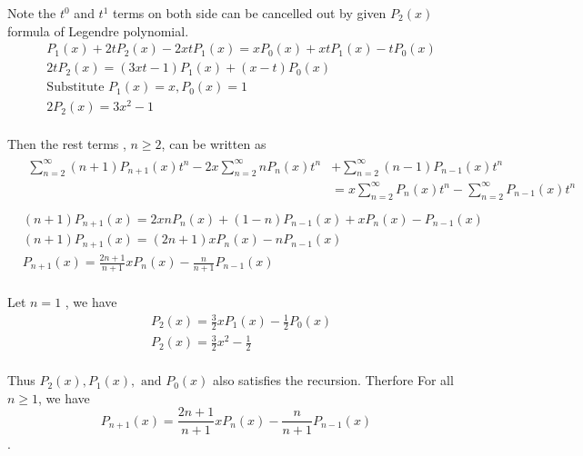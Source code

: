 \documentclass{article}
\begin{document}
Note the $ t^0 $ and $ t^1$ terms on both side can be cancelled out by given $ P_2 (x) $ formula of Legendre polynomial.
    \begin{equation}
      \begin{split}
        &P_1 (x) + 2 tP_2 (x) - 2 xt P_1 (x) = x P_0 (x) + xt P_1 (x) - tP_0(x)\\
        &2t P_2 (x) = (3xt - 1) P_1(x) + (x - t) P_0 (x)\\
        &\text{Substitute } P_1 (x) = x, P_0 (x) = 1\\
        &2 P_2 (x) = 3x^2 - 1\\
      \end{split}
    \end{equation}

Then the rest terms , $n \geq 2$, can be written as
    \begin{equation}
      \begin{split}
        &\begin{split}
          \sum_{n=2}^{\infty} (n+1) P_{n+1}(x) t^{n} - 2x \sum_{n=2}^{\infty} n P_{n}(x) t^{n}& +  \sum_{n=2}^{\infty} (n-1) P_{n-1}(x) t^{n} \\
          &= x \sum_{n=2}^{\infty} P_{n}(x) t^{n} -  \sum_{n=2}^{\infty} P_{n-1}(x) t^{n} \\
        \end{split}\\
        & (n+1) P_{n+1}(x)  =  2xn P_{n}(x) +  (1-n) P_{n-1}(x) + x P_{n}(x) -  P_{n-1}(x)\\
        & (n+1) P_{n+1}(x)  =  (2n+1)x P_{n}(x) -n P_{n-1}(x)\\
        & P_{n+1}(x)  =  \frac{2n+1}{n+1}xP_{n}(x) -\frac{n}{n+1} P_{n-1}(x)\\
      \end{split}
    \end{equation}

Let $ n = 1$ , we have
    \begin{equation}
      \begin{split}
        & P_{2}(x)  =  \frac{3}{2}xP_{1}(x) - \frac{1}{2} P_{0}(x)\\
        & P_{2}(x)  =  \frac{3}{2}x^2 - \frac{1}{2}\\
      \end{split}
    \end{equation}

Thus $P_{2}(x), P_{1}(x), \text{ and } P_{0}(x)$ also satisfies the recursion. Therfore For all $n \geq 1 $, we have
$$ P_{n+1}(x)  =  \frac{2n+1}{n+1}xP_{n}(x) -\frac{n}{n+1} P_{n-1}(x) $$ .
\end{document}
